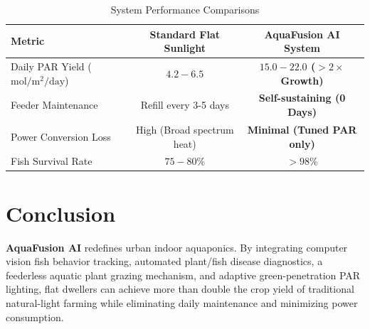\documentclass[12pt,a4paper]{article}
\begin{document}
\begin{table}[h!]
\centering
\caption{System Performance Comparisons}
\begin{tabular}{lcc}
\toprule
\textbf{Metric} & \textbf{Standard Flat Sunlight} & \textbf{AquaFusion AI System} \\
\midrule
Daily PAR Yield ($\text{mol}/\text{m}^2/\text{day}$) & $4.2 - 6.5$ & \textbf{$15.0 - 22.0$ ($>2\times$ Growth)} \\
Feeder Maintenance & Refill every 3-5 days & \textbf{Self-sustaining (0 Days)} \\
Power Conversion Loss & High (Broad spectrum heat) & \textbf{Minimal (Tuned PAR only)} \\
Fish Survival Rate & $75-80\%$ & \textbf{$>98\%$} \\
\bottomrule
\end{tabular}
\end{table}

\section{Conclusion}
\textbf{AquaFusion AI} redefines urban indoor aquaponics. By integrating computer vision fish behavior tracking, automated plant/fish disease diagnostics, a feederless aquatic plant grazing mechanism, and adaptive green-penetration PAR lighting, flat dwellers can achieve more than double the crop yield of traditional natural-light farming while eliminating daily maintenance and minimizing power consumption.
\end{document}
